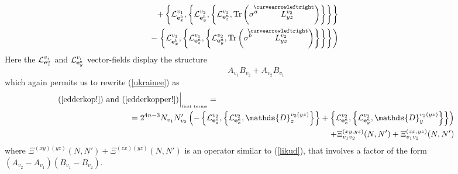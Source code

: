 \documentclass[12pt]{article}
\newcommand{\nn}{\nonumber}
\def\cl{{\cal L}}
\begin{document}
\begin{appendix}
\begin{eqnarray}
\nn\\
&&\hspace{-1.35cm}+
 \left\{ \cl^{v_1}_{{\bf e}^b_x} ,  \left\{ \cl^{v_2}_{{\bf e}^b_y}       
, \left\{ \cl^{v_1}_{{\bf e}^a_z}  , \mbox{Tr} \left( \sigma^a  \stackrel{\hspace{-3mm}\curvearrowleftright}{L^{v_2}_{yz}}        \right) \right\} \right\} \right\}
\nn\\&&\hspace{-1.35cm}
-
\left. \left\{ \cl^{v_1}_{{\bf e}^b_x} ,  \left\{ \cl^{v_1}_{{\bf e}^a_z}     
, \left\{ \cl^{v_2}_{{\bf e}^a_y}  , \mbox{Tr} \left( \sigma^b  \stackrel{\hspace{-3mm}\curvearrowleftright}{L^{v_2}_{yz}}        \right) \right\} \right\} \right\}
\right)
%
\label{ukrainee}
\end{eqnarray}
Here the $\cl^{v_i}_{{\bf e}^a_z}$ and $\cl^{v_i}_{{\bf e}^a_y}$ vector-fields display the structure
$$
A_{v_1} B_{v_2} + A_{v_2} B_{v_1}
$$
which again permits us to rewrite (\ref{ukrainee}) as
\begin{eqnarray}
\mbox{(\ref{edderkop!}) and (\ref{edderkopper!})}\Big\vert_{\mbox{\tiny first terms}} =\hspace{0cm} &&\nn\\
&&\hspace{-4cm}= 2^{4n-3}N_{v_1}N'_{v_2}
\left(
 -\left\{  \cl^{v_2}_{{\bf e}^a_z} ,  \left\{  \cl^{v_2}_{{\bf e}^a_x}     , \mathds{D}^{v_2(yz)}_{z}  \right\} \right\}
+
 \left\{ \cl^{v_2}_{{\bf e}^a_x} ,  \left\{ \cl^{v_2}_{{\bf e}^a_y}       
, \mathds{D}^{v_2(yz)}_{y}  \right\} \right\}
\right) 
\nn\\&&\hspace{-4cm}
+\Xi^{(xy,yz)}_{v_1v_2}(N,N')
+\Xi^{(zx,yz)}_{v_1v_2}(N,N')%
\label{komisch}
\end{eqnarray}
where $\Xi^{(xy)(yz)}(N,N') + \Xi^{(zx)(yz)}(N,N')$ is an operator similar to (\ref{likud}), that involves a factor of the form $(A_{v_2}- A_{v_1}) (B_{v_1}-B_{v_2})$.%



\end{appendix}
\end{document}
